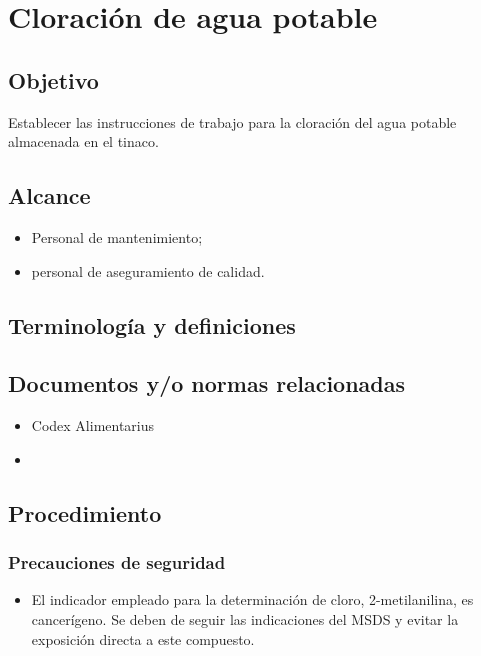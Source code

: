 \thispagestyle{formato-PI}
\renewcommand{\MenorVer}{0}
\renewcommand{\MayorVer}{2}
\renewcommand{\Codigo}{HYS-24-IT}
\renewcommand{\FechaPub}{2023--01}
\renewcommand{\Titulo}{Cloración de agua potable}

\section{\Titulo}

\subsection{Objetivo}
Establecer las instrucciones de trabajo para la cloración del agua potable almacenada en el tinaco.

\subsection{Alcance}
\begin{itemize}
	\item Personal de mantenimiento;
	\item personal de aseguramiento de calidad.
\end{itemize}

\subsection{Terminología y definiciones}
\begin{description}
\end{description}

\subsection{Documentos y/o normas relacionadas}
\begin{itemize}
	\item Codex Alimentarius
	\item \BitClor
\end{itemize}

\subsection{Procedimiento}
\subsubsection{Precauciones de seguridad}
\begin{itemize}
	\item El indicador empleado para la determinación de cloro, 2-metilanilina, es cancerígeno. Se deben de seguir las indicaciones del MSDS y evitar la exposición directa a este compuesto.
\end{itemize}

